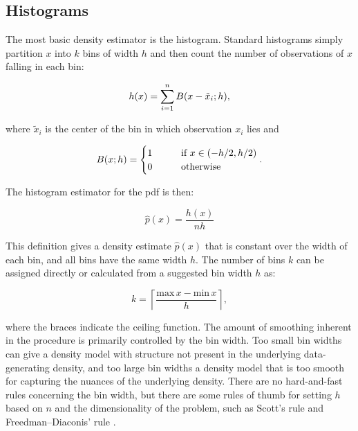 \subsection{Histograms} 

The most basic density estimator is the histogram. Standard histograms simply partition $x$ into $k$ bins of width $h$ and then count the number of observations of $x$ falling in each bin: 

\begin{equation*}
    h (x) = \sum_{i=1}^n B \qty(x - \tilde{x}_i ; h),
\end{equation*}

where $\tilde{x}_i$ is the center of the bin in which observation $x_i$ lies and 

\begin{equation*}
    B (x ; h) = \begin{cases}
    1 \qquad &\text{if } x \in \qty(-h/2, h/2) 
    \\
    0 \qquad &\text{otherwise}
    \end{cases}.
\end{equation*}

The histogram estimator for the pdf is then: 

\begin{equation}\label{eq:hist_densest}
    \hat{p}(x) = \frac{h(x)}{n h}
\end{equation}

This definition gives a density estimate $\hat{p}(x)$ that is constant over the width of each bin, and all bins have the same width $h$. The number of bins $k$ can be assigned directly or calculated from a suggested bin width $h$ as:

\begin{equation*}
    k = \left \lceil \frac{\mathrm{max}\, x - \mathrm{min}\, x}{h} \right \rceil, 
\end{equation*}

where the braces indicate the ceiling function. The amount of smoothing inherent in the procedure is primarily controlled by the bin width. Too small bin widths can give a density model with structure not present in the underlying data-generating density, and too large bin widths a density model that is too smooth for capturing the nuances of the underlying density. There are no hard-and-fast rules concerning the bin width, but there are some rules of thumb for setting $h$ based on $n$ and the dimensionality of the problem, such as Scott's rule \cite{scott_bin_width} and Freedman–Diaconis' rule \cite{freedman_diaconis}.

